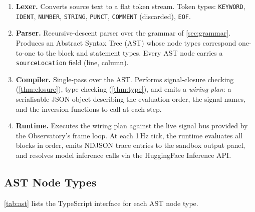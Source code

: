 \documentclass[10pt,twocolumn,a4paper]{article}
\theoremstyle{definition}
\theoremstyle{remark}
\begin{document}
\begin{enumerate}[leftmargin=*,nosep]
\item \textbf{Lexer.} Converts source text to a flat token stream.
  Token types: \texttt{KEYWORD}, \texttt{IDENT}, \texttt{NUMBER},
  \texttt{STRING}, \texttt{PUNCT}, \texttt{COMMENT} (discarded),
  \texttt{EOF}.

\item \textbf{Parser.} Recursive-descent parser over the grammar of
  \cref{sec:grammar}.  Produces an Abstract Syntax Tree (AST) whose
  node types correspond one-to-one to the block and statement types.
  Every AST node carries a \texttt{sourceLocation} field (line, column).

\item \textbf{Compiler.} Single-pass over the AST.  Performs
  signal-closure checking (\cref{thm:closure}), type checking
  (\cref{thm:type}), and emits a \emph{wiring plan}: a serialisable
  JSON object describing the evaluation order, the signal names,
  and the inversion functions to call at each step.

\item \textbf{Runtime.} Executes the wiring plan against the live
  signal bus provided by the Observatory's frame loop.  At each
  1\,Hz tick, the runtime evaluates all blocks in order, emits
  NDJSON trace entries to the sandbox output panel, and resolves
  model inference calls via the HuggingFace Inference API.
\end{enumerate}

\subsection{AST Node Types}

\cref{tab:ast} lists the TypeScript interface for each AST node type.
\end{document}
